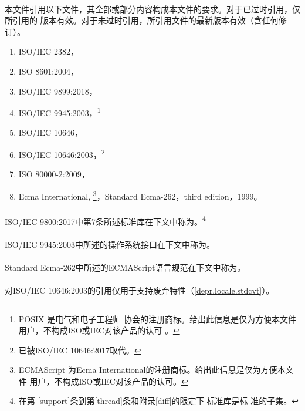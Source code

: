 \paragraph{}
本文件引用以下文件，其全部或部分内容构成本文件的要求。对于已过时引用，仅所引用的
版本有效。对于未过时引用，所引用文件的最新版本有效（含任何修订）。
\begin{enumerate}
  \item{ISO/IEC 2382，}
  \item{ISO 8601:2004，}
  \item{ISO/IEC 9899:2018，}
  \item{ISO/IEC 9945:2003，\footnote{POSIX \textregistered{}是电气和电子工程师
    协会的注册商标。给出此信息是仅为方便本文件用户，不构成ISO或IEC对该产品的认可
    。}}
  \item{ISO/IEC 10646，}
  \item{ISO/IEC 10646:2003，\footnote{已被ISO/IEC 10646:2017取代。}
    }
  \item{ISO 80000-2:2009，}
  \item{Ecma International,  \footnote{ECMAScript
    \textregistered{}为Ecma International的注册商标。给出此信息是仅为方便本文件
    用户，不构成ISO或IEC对该产品的认可。}，Standard
    Ecma-262，third edition，1999。}
\end{enumerate}

\paragraph{}
ISO/IEC 9800:2017中第7条所述标准库在下文中称为。\footnote{在第
\ref{support}条到第\ref{thread}条和附录\ref{diff}的限定下，\c{}标准库是\cpp{}标
准的子集。}

\paragraph{}
ISO/IEC 9945:2003中所述的操作系统接口在下文中称为。

\paragraph{}
Standard Ecma-262中所述的ECMAScript语言规范在下文中称为。

\paragraph{}
\begin{note}
对ISO/IEC 10646:2003的引用仅用于支持废弃特性（\ref{depr.locale.stdcvt}）。
\end{note}
